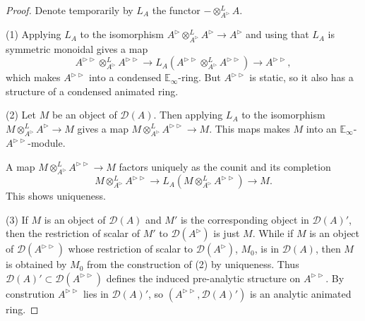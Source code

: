 \documentclass{article}
\theoremstyle{plain}
\theoremstyle{definition}
\theoremstyle{remark}
\newcommand{\dten}{\otimes ^{L}}
\newcommand{\huflag}{\triangleright}
\newcommand{\D}{\mathcal{D}}
\begin{document}
\begin{proof}
Denote temporarily by $ L _{A} $ the functor $ -\dten _{A ^{\huflag}} A $.

(1)
Applying $ L _{A} $ to the isomorphism $ A ^{\huflag}\dten _{A ^{\huflag}} A ^{\huflag} \to A ^{\huflag} $
and using that $ L _{A} $ is symmetric monoidal gives a map 
$$ A ^{\huflag\huflag}\dten _{A ^{\huflag}} A ^{\huflag\huflag}\to L _{A} (A ^{\huflag\huflag} \dten _{A ^{\huflag}} A ^{\huflag\huflag})
\to A ^{\huflag\huflag}, $$
which makes $ A ^{\huflag\huflag} $ into a condensed $ \mathbb{E}_{\infty} $-ring.
But $ A ^{\huflag\huflag} $ is static, so it also has a structure of a condensed animated ring.

(2)
Let $ M $ be an object of $ \D (A) $. Then applying $ L _{A} $ to the isomorphism $ M\dten _{A ^{\huflag}} A ^{\huflag}\to M $ gives a map
$ M \dten _{A ^{\huflag}} A ^{\huflag\huflag}\to M $.
This maps makes $ M $ into an $ \mathbb{E}_{\infty} $-$ A ^{\huflag\huflag} $-module.

A map $ M\dten _{A ^{\huflag}} A ^{\huflag\huflag} \to M $ factors uniquely as the counit and its completion
$$M \dten _{A ^{\huflag}}A ^{\huflag\huflag}\to L _{A}(M \dten _{A ^{\huflag}} A ^{\huflag\huflag}) \to M .$$
This shows uniqueness.

(3)
If $ M $ is an object of $ \D (A) $ and $ M' $ is the corresponding object in $ \D (A)' $,
then the restriction of scalar of $ M' $ to $ \D (A ^{\huflag}) $ is just $ M $.
While if $ M $ is an object of $ \D (A ^{\huflag\huflag}) $ whose restriction of scalar to $ \D (A ^{\huflag}) $, $ M _{0} $,
is in $ \D (A) $, then $ M $ is obtained by $ M _{0} $ from the construction of (2) by uniqueness.
Thus $ \D (A)' \subset \D (A ^{\huflag\huflag}) $ defines the induced pre-analytic structure on $ A ^{\huflag\huflag} $.
By constrution $ A ^{\huflag\huflag} $ lies in $ \D (A)' $,
so $ (A ^{\huflag\huflag}, \D (A)') $ is an analytic animated ring.


\end{proof}
\end{document}
